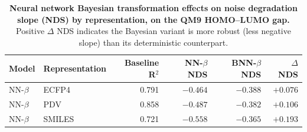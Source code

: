 
\begin{table}[H]
\centering
\caption{\textbf{\SuppFile{} Neural network Bayesian transformation effects on noise degradation slope (NDS) by representation, on the QM9 HOMO--LUMO gap.}
Positive $\Delta$ NDS indicates the Bayesian variant is more robust (less negative slope) than its deterministic counterpart.}
\label{supp:bayesian_transformation_tests}
\small
\begin{tabular}{llrrrr}
\toprule
\textbf{Model} & \textbf{Representation} & \textbf{Baseline R$^2$} & \textbf{NN-$\beta$ NDS} & \textbf{BNN-$\beta$ NDS} & \textbf{$\Delta$ NDS} \\
\midrule
NN-$\beta$ & ECFP4 & 0.791 & $-0.464$ & $-0.388$ & $+0.076$ \\
NN-$\beta$ & PDV & 0.858 & $-0.487$ & $-0.382$ & $+0.106$ \\
NN-$\beta$ & SMILES & 0.721 & $-0.558$ & $-0.365$ & $+0.193$ \\
\bottomrule
\end{tabular}
\end{table}
